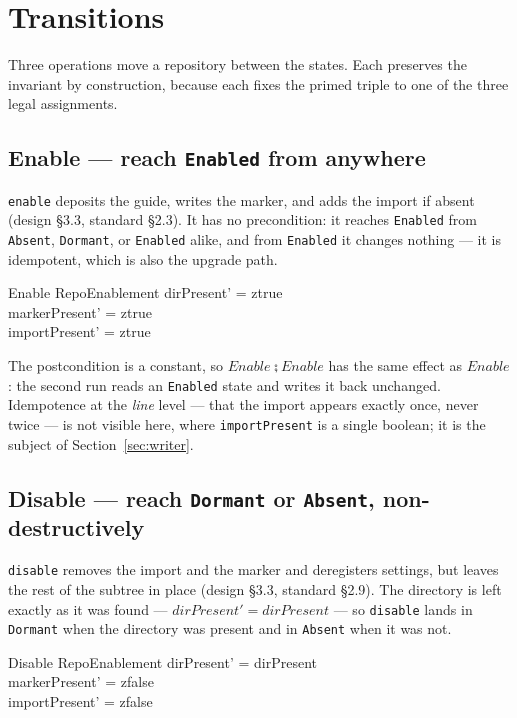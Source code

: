 \documentclass[a4paper,10pt,fleqn]{article}
\begin{document}
\section{Transitions}
\label{sec:transitions}

Three operations move a repository between the states. Each preserves the
invariant by construction, because each fixes the primed triple to one of the
three legal assignments.

\subsection{Enable --- reach \texttt{Enabled} from anywhere}

\texttt{enable} deposits the guide, writes the marker, and adds the import if
absent (design \S3.3, standard \S2.3). It has no precondition: it reaches
\texttt{Enabled} from \texttt{Absent}, \texttt{Dormant}, or \texttt{Enabled}
alike, and from \texttt{Enabled} it changes nothing --- it is idempotent, which
is also the upgrade path.

\begin{schema}{Enable}
  \Delta RepoEnablement
  \where
  dirPresent' = ztrue \\
  markerPresent' = ztrue \\
  importPresent' = ztrue
\end{schema}

The postcondition is a constant, so $Enable \semi Enable$ has the same effect as
$Enable$: the second run reads an \texttt{Enabled} state and writes it back
unchanged. Idempotence at the \emph{line} level --- that the import appears
exactly once, never twice --- is not visible here, where \texttt{importPresent}
is a single boolean; it is the subject of Section~\ref{sec:writer}.

\subsection{Disable --- reach \texttt{Dormant} or \texttt{Absent}, non-destructively}

\texttt{disable} removes the import and the marker and deregisters settings, but
leaves the rest of the subtree in place (design \S3.3, standard \S2.9). The
directory is left exactly as it was found --- $dirPresent' = dirPresent$ --- so
\texttt{disable} lands in \texttt{Dormant} when the directory was present and in
\texttt{Absent} when it was not.

\begin{schema}{Disable}
  \Delta RepoEnablement
  \where
  dirPresent' = dirPresent \\
  markerPresent' = zfalse \\
  importPresent' = zfalse
\end{schema}
\end{document}
